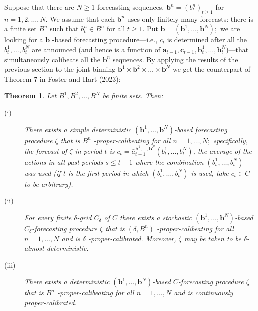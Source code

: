 \documentclass[12pt,a4paper,notitlepage]{article}
\newtheorem{theorem}{Theorem}
\begin{document}
Suppose that there are $N\geq 1$ forecasting sequences, $\mathbf{b}%
^{n}=(b_{t}^{n})_{t\geq 1}$ for $n=1,2,\ldots ,N$. We assume that each $%
\mathbf{b}^{n}$ uses only finitely many forecasts: there is a finite set $%
B^{n}$ such that $b_{t}^{n}\in B^{n}$ for all $t\geq 1$. Put $\mathbf{b}=(%
\mathbf{b}^{1},\ldots ,\mathbf{b}^{N});$ we are looking for a $\mathbf{b}$%
-based forecasting procedure---i.e., $c_{t}$ is determined after all the $%
b_{t}^{1},\ldots ,b_{t}^{N}$ are announced (and hence is a function of $%
\mathbf{a}_{t-1},\mathbf{c}_{t-1},\mathbf{b}_{t}^{1},\ldots ,\mathbf{b}%
_{t}^{N}$)---that simultaneously calibeats all the $\mathbf{b}^{n}$
sequences. By applying the results of the previous section to the joint
binning $\mathbf{b}^{1}\times \mathbf{b}^{2}\times \ldots \times \mathbf{b}%
^{N}$ we get the counterpart of Theorem 7 in Foster and Hart (2023):

\begin{theorem}
\label{th:multi}Let $B^{1},B^{2},\ldots ,B^{N}$ be finite sets. Then:

\begin{description}
\item[(i)] There exists a simple deterministic $(\mathbf{b}^{1},\ldots ,%
\mathbf{b}^{N})$-based forecasting procedure $\zeta $ that is $B^{n}$%
-proper-calibeating for all $n=1,\ldots ,N;$ specifically, the forecast of $%
\zeta $ in period $t$ is $c_{t}=\bar{a}_{t-1}^{\mathbf{b}^{1},\ldots ,%
\mathbf{b}^{N}}(b_{t}^{1},\ldots ,b_{t}^{N})$, the average of the actions in
all past periods $s\leq t-1$ where the combination $(b_{t}^{1},\ldots
,b_{t}^{N})$ was used (if $t$ is the first period in which $%
(b_{t}^{1},\ldots ,b_{t}^{N})$ is used, take $c_{t}\in C$ to be arbitrary).

\item[(ii)] For every finite $\delta $-grid $C_{\delta }$ of $C$ there
exists a stochastic $(\mathbf{b}^{1},\ldots ,\mathbf{b}^{N})$-based $%
C_{\delta }$-forecasting procedure $\zeta $ that is $(\delta ,B^{n})$%
-proper-calibeating for all $n=1,\ldots ,N$ and is $\delta $%
-proper-calibrated. Moreover, $\zeta $ may be taken to be $\delta $-almost
deterministic.

\item[(iii)] There exists a deterministic $(\mathbf{b}^{1},\ldots ,\mathbf{b}%
^{N})$-based $C$-forecasting procedure $\zeta $ that is $B^{n}$%
-proper-calibeating for all $n=1,\ldots ,N$ and is continuously
proper-calibrated.
\end{description}
\end{theorem}
\end{document}
